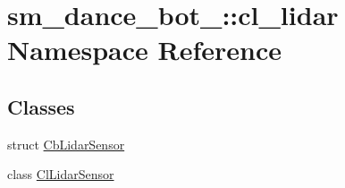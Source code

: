 \hypertarget{namespacesm__dance__bot__2_1_1cl__lidar}{}\section{sm\+\_\+dance\+\_\+bot\+\_\+:\+:cl\+\_\+lidar Namespace Reference}
\label{namespacesm__dance__bot__2_1_1cl__lidar}
\subsection*{Classes}
\begin{DoxyCompactItemize}
\item 
struct \hyperlink{structsm__dance__bot__2_1_1cl__lidar_1_1CbLidarSensor}{Cb\+Lidar\+Sensor}
\item 
class \hyperlink{classsm__dance__bot__2_1_1cl__lidar_1_1ClLidarSensor}{Cl\+Lidar\+Sensor}
\end{DoxyCompactItemize}
